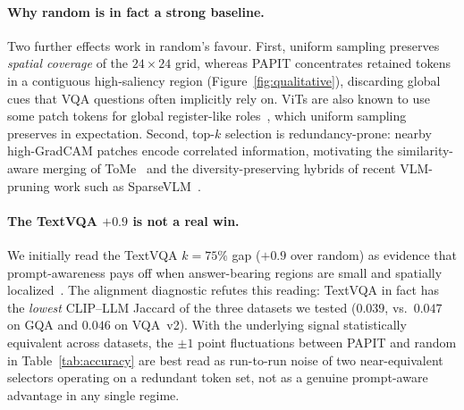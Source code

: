 \documentclass[10pt,twocolumn,letterpaper]{article}
\begin{document}
\paragraph{Why random is in fact a strong baseline.}
Two further effects work in random's favour. First, uniform sampling
preserves \emph{spatial coverage} of the $24{\times}24$ grid, whereas
PAPIT concentrates retained tokens in a contiguous high-saliency
region (Figure~\ref{fig:qualitative}), discarding global cues that
VQA questions often implicitly rely on. ViTs are also known to use
some patch tokens for global register-like
roles~\cite{darcet2024registers}, which uniform sampling preserves
in expectation. Second, top-$k$ selection is redundancy-prone:
nearby high-GradCAM patches encode correlated information, motivating
the similarity-aware merging of ToMe~\cite{bolya2023tome} and the
diversity-preserving hybrids of recent VLM-pruning work such as
SparseVLM~\cite{zhang2024sparsevlm}.

\paragraph{The TextVQA $+0.9$ is not a real win.}
We initially read the TextVQA $k{=}75\%$ gap ($+0.9$ over random) as
evidence that prompt-awareness pays off when answer-bearing regions
are small and spatially localized~\cite{singh2019textvqa}. The
alignment diagnostic refutes this reading: TextVQA in fact has the
\emph{lowest} CLIP--LLM Jaccard of the three datasets we tested
($0.039$, vs.\ $0.047$ on GQA and $0.046$ on VQA~v2). With the
underlying signal statistically equivalent across datasets, the
$\pm 1$ point fluctuations between PAPIT and random in
Table~\ref{tab:accuracy} are best read as run-to-run noise of two
near-equivalent selectors operating on a redundant token set, not as
a genuine prompt-aware advantage in any single regime.
\end{document}
